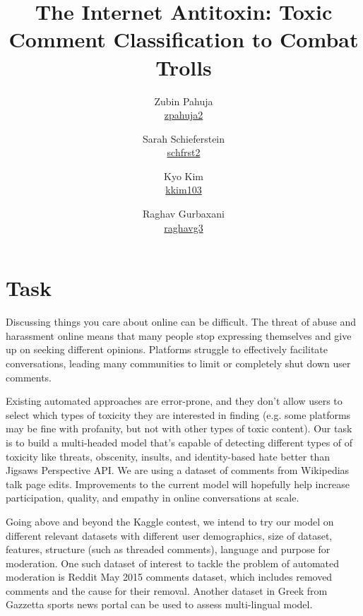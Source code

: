 \documentclass[11pt,letterpaper]{article}
\newcommand{\blue}[1]{\textcolor{RoyalBlue}{#1}}
\newcommand{\instructions}[1]{\blue{\textit{#1}}}
\renewcommand{\instructions}[1]{}
\begin{document}
\title{\textbf{The Internet Antitoxin: Toxic Comment Classification to Combat Trolls}}
\author{Zubin Pahuja \\ \href{mailto:zpahuja2@illinois.edu}{zpahuja2}
    \and Sarah Schieferstein \\ \href{mailto:schfrst2@illinois.edu}{schfrst2}
    \and Kyo Kim \\ \href{mailto:kkim103@illinois.edu}{kkim103}
    \and Raghav Gurbaxani \\ \href{mailto:raghavg3@illinois.edu}{raghavg3}
    }

\maketitle

\instructions{CS546 involves a research project. This is a template
  for the initial proposal, which will be help us make sure your
  project is both suitable, feasible and interesting.
You can just uncomment the following two lines in the preamble of the .tex file for the instructions to disappear:
\texttt{\%$\backslash$renewcommand\{$\backslash$instructions\}[1]\{\}}~ and \texttt{\%$\backslash$renewcommand\{$\backslash$fillme\}[1]\{\}}
}
\section*{Task}
\instructions{Describe the task you want to tackle in your project.}
Discussing things you care about online can be difficult. The threat of abuse and harassment online means that many people stop expressing themselves and give up on seeking different opinions. Platforms struggle to effectively facilitate conversations, leading many communities to limit or completely shut down user comments.

Existing automated approaches are error-prone, and they don’t allow users to select which types of toxicity they are interested in finding (e.g. some platforms may be fine with profanity, but not with other types of toxic content). Our task is to build a multi-headed model that’s capable of detecting different types of of toxicity like threats, obscenity, insults, and identity-based hate better than Jigsaw\textquotesingle s Perspective API. We are using a dataset of comments from Wikipedia\textquotesingle s talk page edits. Improvements to the current model will hopefully help increase participation, quality, and empathy in online conversations at scale.

Going above and beyond the Kaggle contest, we intend to try our model on different relevant datasets with different user demographics, size of dataset, features, structure (such as threaded comments), language and purpose for moderation. One such dataset of interest to tackle the problem of automated moderation is Reddit May 2015 comments dataset, which includes removed comments and the cause for their removal. Another dataset in Greek from Gazzetta sports news portal can be used to assess multi-lingual model.
\end{document}
